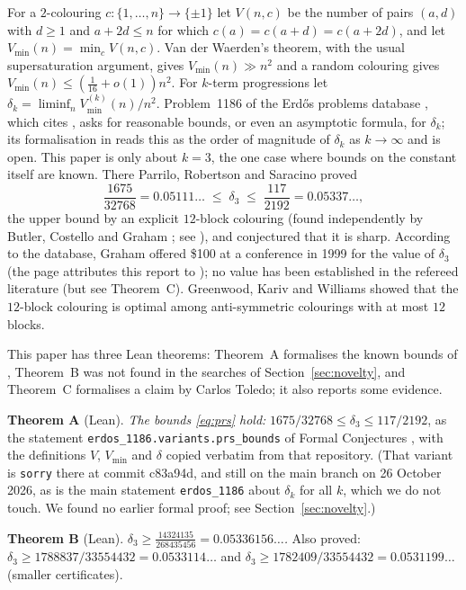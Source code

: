 \documentclass[11pt]{amsart}
\theoremstyle{remark}
\newcommand{\mono}{V}
\newcommand{\mmin}{V_{\min}}
\begin{document}
For a $2$-colouring $c\colon\{1,\dots,n\}\to\{\pm1\}$ let $\mono(n,c)$ be the number of pairs $(a,d)$ with $d\ge1$ and $a+2d\le n$
for which $c(a)=c(a+d)=c(a+2d)$, and let $\mmin(n)=\min_c\mono(n,c)$. Van der Waerden's theorem, with the usual supersaturation argument, gives $\mmin(n)\gg n^2$ and a random
colouring gives $\mmin(n)\le(\tfrac1{16}+o(1))n^2$. For $k$-term progressions let $\delta_k=\liminf_n\mmin^{(k)}(n)/n^2$.
Problem~1186 of the Erd\H{o}s problems database \cite{EP1186}, which cites \cite[p.~93]{Er80}, asks for reasonable bounds, or even an
asymptotic formula, for $\delta_k$; its formalisation in \cite{FC} reads this as the order of magnitude of $\delta_k$ as $k\to\infty$ and is open.
This paper is only about $k=3$, the one case where bounds on the constant itself are known. There
Parrilo, Robertson and Saracino \cite{PRS08} proved
\begin{equation}\label{eq:prs}
\frac{1675}{32768}=0.05111\ldots\;\le\;\delta_3\;\le\;\frac{117}{2192}=0.05337\ldots,
\end{equation}
the upper bound by an explicit $12$-block colouring (found independently by Butler, Costello and Graham \cite{BCG10}; see \cite{BGL14}), and
conjectured that it is sharp. According to the database, Graham offered \$100 at a conference in 1999 for the value of $\delta_3$ (the page attributes this report to
\cite{PRS08}); no value has been established in the refereed literature (but see Theorem~C). Greenwood, Kariv and
Williams \cite{GKW23} showed that the $12$-block colouring is optimal among anti-symmetric colourings with at most $12$ blocks.

This paper has three Lean theorems: Theorem~A formalises the known bounds of \cite{PRS08}, Theorem~B was not found in the searches of Section~\ref{sec:novelty}, and Theorem~C formalises a claim by Carlos Toledo; it also reports some evidence.

\medskip\noindent\textbf{Theorem A} (Lean). \emph{The bounds \eqref{eq:prs} hold:}
$1675/32768\le\delta_3\le117/2192$, as the statement \texttt{erdos\_1186.variants.prs\_bounds} of Formal Conjectures
\cite{FC}, with the definitions $\mono$, $\mmin$ and $\delta$ copied verbatim from that repository. (That variant is \texttt{sorry}
there at commit c83a94d, and still on the main branch on 26 October 2026, as is the main statement \texttt{erdos\_1186} about $\delta_k$ for all $k$, which we do not touch. We found no earlier formal proof; see Section~\ref{sec:novelty}.)

\medskip\noindent\textbf{Theorem B} (Lean). \emph{$\displaystyle\delta_3\ge\frac{14324135}{268435456}=0.05336156\ldots$.}
Also proved: $\delta_3\ge 1788837/33554432=0.0533114\ldots$ and $\delta_3\ge 1782409/33554432=0.0531199\ldots$ (smaller certificates).
\end{document}
